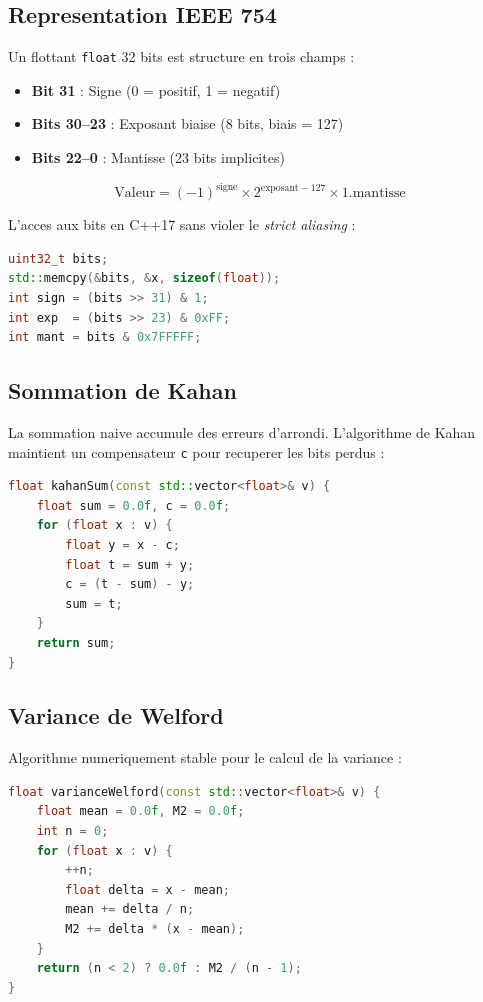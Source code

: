 \documentclass[12pt,a4paper]{article}
\begin{document}
\subsection{Representation IEEE 754}

Un flottant \texttt{float} 32 bits est structure en trois champs :
\begin{itemize}
    \item \textbf{Bit 31} : Signe (0 = positif, 1 = negatif)
    \item \textbf{Bits 30--23} : Exposant biaise (8 bits, biais = 127)
    \item \textbf{Bits 22--0} : Mantisse (23 bits implicites)
\end{itemize}

\[
    \text{Valeur} = (-1)^{\text{signe}} \times 2^{\text{exposant}-127} \times 1.\text{mantisse}
\]

L'acces aux bits en C++17 sans violer le \textit{strict aliasing} :
\begin{lstlisting}[language=C++, caption=Lecture des bits IEEE 754]
uint32_t bits;
std::memcpy(&bits, &x, sizeof(float));
int sign = (bits >> 31) & 1;
int exp  = (bits >> 23) & 0xFF;
int mant = bits & 0x7FFFFF;
\end{lstlisting}

\subsection{Sommation de Kahan}

La sommation naive accumule des erreurs d'arrondi. L'algorithme de Kahan maintient
un compensateur \texttt{c} pour recuperer les bits perdus :

\begin{lstlisting}[language=C++, caption=Algorithme de Kahan]
float kahanSum(const std::vector<float>& v) {
    float sum = 0.0f, c = 0.0f;
    for (float x : v) {
        float y = x - c;
        float t = sum + y;
        c = (t - sum) - y;
        sum = t;
    }
    return sum;
}
\end{lstlisting}

\subsection{Variance de Welford}

Algorithme numeriquement stable pour le calcul de la variance :

\begin{lstlisting}[language=C++, caption=Algorithme de Welford]
float varianceWelford(const std::vector<float>& v) {
    float mean = 0.0f, M2 = 0.0f;
    int n = 0;
    for (float x : v) {
        ++n;
        float delta = x - mean;
        mean += delta / n;
        M2 += delta * (x - mean);
    }
    return (n < 2) ? 0.0f : M2 / (n - 1);
}
\end{lstlisting}
\end{document}
